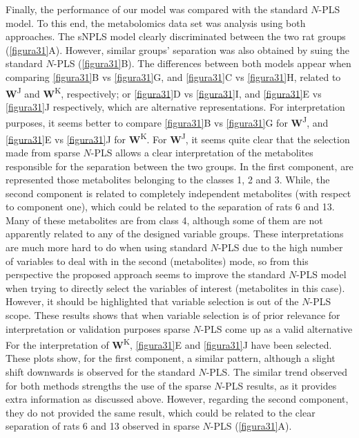 Finally, the performance of our model was compared with the standard $N$-PLS model. To this end, the metabolomics data set was analysis using both approaches. The sNPLS model clearly discriminated between the two rat groups (\autoref{figura31}A). However, similar groups’ separation was also obtained by suing the standard $N$-PLS (\autoref{figura31}B). The differences between both models appear when comparing \autoref{figura31}B vs \autoref{figura31}G, and \autoref{figura31}C vs \autoref{figura31}H, related to \textbf{W}\textsuperscript{J} and \textbf{W}\textsuperscript{K}, respectively; or \autoref{figura31}D vs \autoref{figura31}I, and \autoref{figura31}E vs \autoref{figura31}J respectively, which are alternative representations. For interpretation purposes, it seems better to compare \autoref{figura31}B vs \autoref{figura31}G for \textbf{W}\textsuperscript{J}, and \autoref{figura31}E vs \autoref{figura31}J for \textbf{W}\textsuperscript{K}. For \textbf{W}\textsuperscript{J}, it seems quite clear that the selection made from sparse $N$-PLS allows a clear interpretation of the metabolites responsible for the separation between the two groups. In the first component, are represented those metabolites belonging to the classes 1, 2 and 3. While, the second component is related to completely independent metabolites (with respect to component one), which could be related to the separation of rats 6 and 13. Many of these metabolites are from class 4, although some of them are not apparently related to any of the designed variable groups.
These interpretations are much more hard to do when using standard $N$-PLS due to the high number of variables to deal with in the second (metabolites) mode, so from this perspective the proposed approach seems to improve the standard $N$-PLS model when trying to directly select the variables of interest (metabolites in this case). However, it should be highlighted that variable selection is out of the $N$-PLS scope. These results shows that when variable selection is of prior relevance for interpretation or validation purposes sparse $N$-PLS come up as a valid alternative
For the interpretation of \textbf{W}\textsuperscript{K}, \autoref{figura31}E and \autoref{figura31}J have been selected. These plots show,  for the first component, a similar pattern, although a slight shift downwards is observed for the standard $N$-PLS. The similar trend observed for both methods strengths the use of the sparse $N$-PLS results, as it provides extra information as discussed above. However, regarding the second component, they do not provided the same result, which could be related to the clear separation of rats 6 and 13 observed in sparse $N$-PLS (\autoref{figura31}A).

